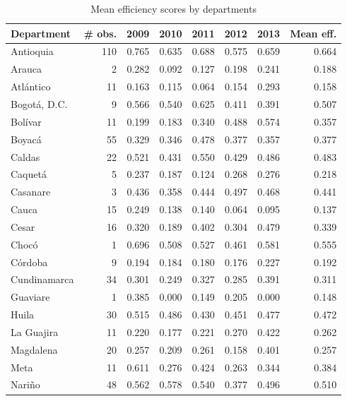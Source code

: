 \documentclass[11pt,a4paper,oneside]{article}
\begin{document}
\begin{table}[htbp]
  \centering
  \caption{Mean efficiency scores by departments}
    \begin{tabular}{lrrrrrrr}
    \toprule
    Department & \multicolumn{1}{l}{\# obs.} & 2009  & 2010  & 2011  & 2012  & 2013  & \multicolumn{1}{l}{Mean eff.} \\
    \midrule
    Antioquia & 110   & 0.765 & 0.635 & 0.688 & 0.575 & 0.659 & 0.664 \\
    Arauca & 2     & 0.282 & 0.092 & 0.127 & 0.198 & 0.241 & 0.188 \\
    Atl\'antico & 11    & 0.163 & 0.115 & 0.064 & 0.154 & 0.293 & 0.158 \\
    Bogot\'a, D.C. & 9     & 0.566 & 0.540 & 0.625 & 0.411 & 0.391 & 0.507 \\
    Bol\'ivar & 11    & 0.199 & 0.183 & 0.340 & 0.488 & 0.574 & 0.357 \\
    Boyac\'a & 55    & 0.329 & 0.346 & 0.478 & 0.377 & 0.357 & 0.377 \\
    Caldas & 22    & 0.521 & 0.431 & 0.550 & 0.429 & 0.486 & 0.483 \\
    Caquet\'a & 5     & 0.237 & 0.187 & 0.124 & 0.268 & 0.276 & 0.218 \\
    Casanare & 3     & 0.436 & 0.358 & 0.444 & 0.497 & 0.468 & 0.441 \\
    Cauca & 15    & 0.249 & 0.138 & 0.140 & 0.064 & 0.095 & 0.137 \\
    Cesar & 16    & 0.320 & 0.189 & 0.402 & 0.304 & 0.479 & 0.339 \\
    Choc\'o & 1     & 0.696 & 0.508 & 0.527 & 0.461 & 0.581 & 0.555 \\
    C\'ordoba & 9     & 0.194 & 0.184 & 0.180 & 0.176 & 0.227 & 0.192 \\
    Cundinamarca & 34    & 0.301 & 0.249 & 0.327 & 0.285 & 0.391 & 0.311 \\
    Guaviare & 1     & 0.385 & 0.000 & 0.149 & 0.205 & 0.000 & 0.148 \\
    Huila & 30    & 0.515 & 0.486 & 0.430 & 0.451 & 0.477 & 0.472 \\
    La Guajira & 11    & 0.220 & 0.177 & 0.221 & 0.270 & 0.422 & 0.262 \\
    Magdalena & 20    & 0.257 & 0.209 & 0.261 & 0.158 & 0.401 & 0.257 \\
    Meta  & 11    & 0.611 & 0.276 & 0.424 & 0.263 & 0.344 & 0.384 \\
    Nari\~{n}o & 48    & 0.562 & 0.578 & 0.540 & 0.377 & 0.496 & 0.510 \\

\end{tabular}
\end{table}
\end{document}
